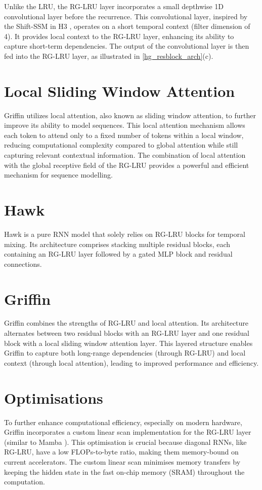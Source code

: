 \documentclass[12pt,a4paper]{report}
\begin{document}
Unlike the LRU, the RG-LRU layer incorporates a small depthwise 1D convolutional layer before the recurrence. This convolutional layer, inspired by the Shift-SSM in H3 \cite{h3}, operates on a short temporal context (filter dimension of 4). It provides local context to the RG-LRU layer, enhancing its ability to capture short-term dependencies. The output of the convolutional layer is then fed into the RG-LRU layer, as illustrated in \ref{hg_resblock_arch}(c).

\section{Local Sliding Window Attention}
Griffin utilizes local attention, also known as sliding window attention, to further improve its ability to model sequences. This local attention mechanism allows each token to attend only to a fixed number of tokens within a local window, reducing computational complexity compared to global attention while still capturing relevant contextual information. The combination of local attention with the global receptive field of the RG-LRU provides a powerful and efficient mechanism for sequence modelling.

\section{Hawk}
Hawk is a pure RNN model that solely relies on RG-LRU blocks for temporal mixing. Its architecture comprises stacking multiple residual blocks, each containing an RG-LRU layer followed by a gated MLP block and residual connections.

\section{Griffin}
Griffin combines the strengths of RG-LRU and local attention. Its architecture alternates between two residual blocks with an RG-LRU layer and one residual block with a local sliding window attention layer. This layered structure enables Griffin to capture both long-range dependencies (through RG-LRU) and local context (through local attention), leading to improved performance and efficiency.

\section{Optimisations}
To further enhance computational efficiency, especially on modern hardware, Griffin incorporates a custom linear scan implementation for the RG-LRU layer (similar to Mamba \cite{mamba}). This optimisation is crucial because diagonal RNNs, like RG-LRU, have a low FLOPs-to-byte ratio, making them memory-bound on current accelerators. The custom linear scan minimises memory transfers by keeping the hidden state in the fast on-chip memory (SRAM) throughout the computation.
\end{document}
